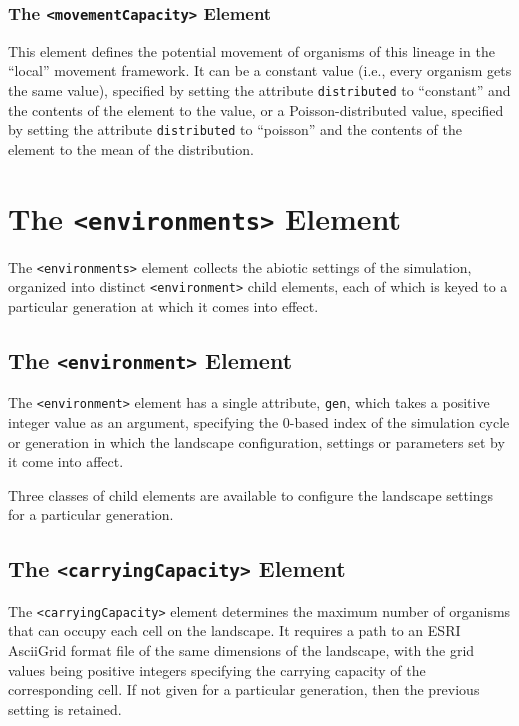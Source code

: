 \documentclass[11pt]{article}
\newcommand{\xmlelem}[1]{{\tt<\textcolor{xmlelem}{#1}>}}
\newcommand{\xmlattr}[1]{{\tt\textcolor{xmlattr}{#1}}}
\begin{document}
\subsubsection{The \xmlelem{movementCapacity} Element}
This element defines the potential movement of organisms of this lineage in the ``local'' movement framework. It can be a constant value (i.e., every organism gets the same value), specified by setting the attribute \xmlattr{distributed} to ``constant'' and the contents of the element to the value, or a Poisson-distributed value, specified by setting the attribute \xmlattr{distributed} to ``poisson'' and the contents of the element to the mean of the distribution.

\section{The \xmlelem{environments} Element}

The \xmlelem{environments} element collects the abiotic settings of the simulation, organized into distinct \xmlelem{environment} child elements, each of which is keyed to a particular generation at which it comes into effect.

\subsection{The \xmlelem{environment} Element}
The \xmlelem{environment} element has a single attribute, \xmlattr{gen}, which takes a positive integer value as an argument, specifying the 0-based index of the simulation cycle or generation in which the landscape configuration, settings or parameters set by it come into affect.

Three classes of child elements are available to configure the landscape settings for a particular generation.

\subsection{The \xmlelem{carryingCapacity} Element}

The \xmlelem{carryingCapacity} element determines the maximum number of organisms that can occupy each cell on the landscape. It requires a path to an ESRI AsciiGrid format file of the same dimensions of the landscape, with the grid values being positive integers specifying the carrying capacity of the corresponding cell. If not given for a particular generation, then the previous setting is retained.
\end{document}
